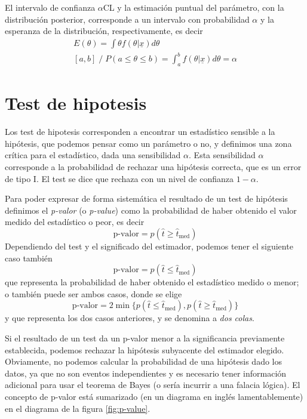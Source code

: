 \documentclass{article}
\numberwithin{equation}{section} %
\begin{document}
El intervalo de confianza $\alpha$CL y la estimación puntual del parámetro, con la distribución posterior, corresponde a un intervalo con probabilidad $\alpha$ y la esperanza de la distribución, respectivamente, es decir
\begin{equation}
\begin{gathered}
E(\theta) = \int \theta f(\theta | \underline{x}) d\theta \\
[a, b] \; / \; P(a \leq \theta \leq b) = \int_a^b f(\theta|\underline{x}) d\theta = \alpha
\end{gathered}
\end{equation}

\section{Test de hipotesis}
Los test de hipotesis corresponden a encontrar un estadístico sensible a la hipótesis, que podemos pensar como un parámetro o no, y definimos una zona crítica para el estadístico, dada una sensibilidad $\alpha$. Esta sensibilidad $\alpha$ corresponde a la probabilidad de rechazar una hipótesis correcta, que es un error de tipo I. El test se dice que rechaza con un nivel de confianza $1 - \alpha$.

Para poder expresar de forma sistemática el resultado de un test de hipótesis definimos el \emph{p-valor} (o \emph{p-value}) como la probabilidad de haber obtenido el valor medido del estadístico o peor, es decir
\begin{equation}
\text{p-valor} = p(\hat{t} \geq \hat{t}_{\text{med}}) 
\end{equation}
Dependiendo del test y el significado del estimador, podemos tener el siguiente caso también
\begin{equation}
\text{p-valor} = p(\hat{t} \leq \hat{t}_{\text{med}})
\end{equation}
que representa la probabilidad de haber obtenido el estadístico medido o menor; o también puede ser ambos casos, donde se elige 
\begin{equation}
\text{p-valor} = 2 \min\{p(\hat{t} \leq \hat{t}_{\text{med}}), p(\hat{t} \geq \hat{t}_{\text{med}})\}
\end{equation}
y que representa los dos casos anteriores, y se denomina a \emph{dos colas}. 

Si el resultado de un test da un p-valor menor a la significancia previamente establecida, podemos rechazar la hipótesis subyacente del estimador elegido. Obviamente, no podemos calcular la probabilidad de una hipótesis dado los datos, ya que no son eventos independientes y es necesario tener información adicional para usar el teorema de Bayes (o sería incurrir a una falacia lógica).  El concepto de p-valor está sumarizado (en un diagrama en inglés lamentablemente) en el diagrama de la figura \ref{fig:p-value}.
\end{document}
